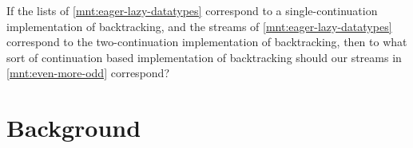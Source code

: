 \documentclass[screen,anonymous,review,draft,natbib=false]{acmart} %
\newcommand{\meta}[2]{[\textsc{#1}: \emph{#2}]}
\newcommand{\todo}[1]{\textcolor{red}{\meta{TODO}{#1}}}
\begin{document}
If the lists of \cref{mnt:eager-lazy-datatypes} correspond to a
single-continuation implementation of backtracking, and the streams of
\cref{mnt:eager-lazy-datatypes} correspond to the two-continuation
implementation of backtracking, then to what sort of continuation
based implementation of backtracking should our streams in
\cref{mnt:even-more-odd} correspond? 




\section{Background}\label{sec:background}















\end{document}
